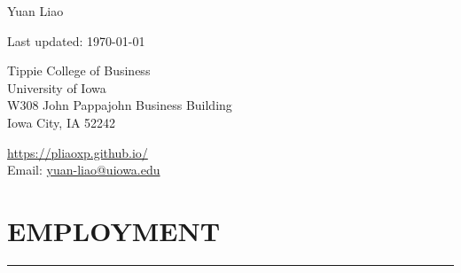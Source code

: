 \documentclass[11pt]{article}
\def\name{Yuan Liao}
\def\footerlink{}
\begin{document}
\begin{center}

 {\huge   Yuan Liao}



\end{center}



\begin{center}
  \begin{footnotesize}
    Last updated: \today \\
    \href{\footerlink}{\texttt{\footerlink}}
  \end{footnotesize}
  \end{center}




\vspace{0.25in}


\begin{minipage}{0.45\linewidth}

Tippie College of Business\\
University  of Iowa\\
W308 John Pappajohn Business Building\\
Iowa City, IA 52242
\end{minipage}
\begin{minipage}{0.45\linewidth}
\href{https://pliaoxp.github.io/}{https://pliaoxp.github.io/} \\
Email: \href{yuan-liao@uiowa.edu}{yuan-liao@uiowa.edu}
 

\end{minipage}



\section*{EMPLOYMENT}
\hrule

\hfill
\end{document}
